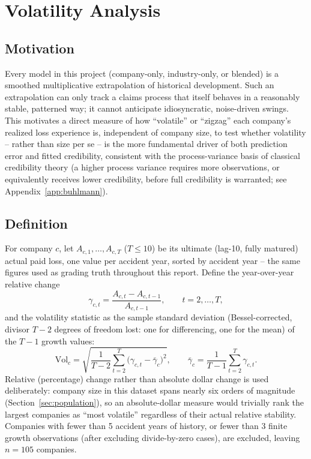 \documentclass[11pt]{article}
\begin{document}
\section{Volatility Analysis}
\label{sec:volatility}

\subsection{Motivation}

Every model in this project (company-only, industry-only, or blended) is a smoothed multiplicative
extrapolation of historical development. Such an extrapolation can only track a claims process
that itself behaves in a reasonably stable, patterned way; it cannot anticipate idiosyncratic,
noise-driven swings. This motivates a direct measure of how ``volatile'' or ``zigzag'' each
company's realized loss experience is, independent of company size, to test whether volatility --
rather than size per se -- is the more fundamental driver of both prediction error and fitted
credibility, consistent with the process-variance basis of classical credibility theory (a higher
process variance requires more observations, or equivalently receives lower credibility, before
full credibility is warranted; see Appendix~\ref{app:buhlmann}).

\subsection{Definition}

For company $c$, let $A_{c,1}, \dots, A_{c,T}$ ($T\le10$) be its ultimate (lag-10, fully matured)
actual paid loss, one value per accident year, sorted by accident year -- the same figures used as
grading truth throughout this report. Define the year-over-year relative change
\begin{equation}
\gamma_{c,t} = \frac{A_{c,t} - A_{c,t-1}}{A_{c,t-1}}, \qquad t=2,\dots,T,
\label{eq:growth}
\end{equation}
and the volatility statistic as the sample standard deviation (Bessel-corrected, divisor $T-2$
degrees of freedom lost: one for differencing, one for the mean) of the $T-1$ growth values:
\begin{equation}
\text{Vol}_c = \sqrt{\frac{1}{T-2}\sum_{t=2}^{T} \bigl(\gamma_{c,t} - \bar\gamma_c\bigr)^2}, \qquad
\bar\gamma_c = \frac{1}{T-1}\sum_{t=2}^{T}\gamma_{c,t}.
\label{eq:volatility}
\end{equation}
Relative (percentage) change rather than absolute dollar change is used deliberately: company size
in this dataset spans nearly six orders of magnitude (Section~\ref{sec:population}), so an
absolute-dollar measure would trivially rank the largest companies as ``most volatile'' regardless
of their actual relative stability. Companies with fewer than 5 accident years of history, or
fewer than 3 finite growth observations (after excluding divide-by-zero cases), are excluded,
leaving $n=105$ companies.
\end{document}

